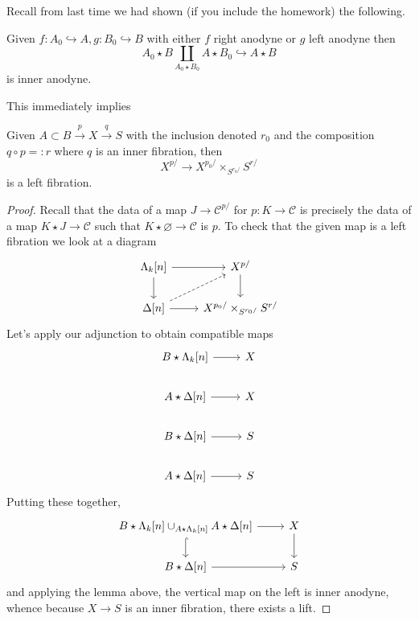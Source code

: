 \documentclass{amsart}
\begin{document}
Recall from last time we had shown (if you include the homework) the following.
\begin{lemma}[HTT 2.1.2.3]
    Given $f:A_0\hookrightarrow A, g:B_0\hookrightarrow B$ with either $f$ right anodyne
    or $g$ left anodyne then
    \begin{equation*}
        A_0\star B\coprod_{A_0\star B_0}A\star B_0 \hookrightarrow A\star B
    \end{equation*}
    is inner anodyne.
\end{lemma}

This immediately implies
\begin{proposition}[HTT 2.1]
    Given $A\subset B\xrightarrow{p} X\xrightarrow{q} S$ with the inclusion denoted $r_0$
    and the composition $q\circ p =: r$ where $q$ is an inner fibration, then 
    \begin{equation*}
        X^{p/} \to X^{p_0/}\times_{S^{r_0/}} S^{r/}
    \end{equation*}
    is a left fibration.
\end{proposition}
\begin{proof}
    Recall that the data of a map $J\to \mathcal{C}^{p/}$ for $p:K\to\mathcal{C}$ is precisely the data of
    a map $K\star J\to \mathcal{C}$ such that $K\star\varnothing\to \mathcal{C}$ is $p$.
    To check that the given map is a left fibration we look at a diagram
    \begin{equation*}
        \begin{tikzcd}
            \Lambda_k[n]\dar \rar & X^{p/}\dar\\
            \Delta[n] \rar\ar[ur,dashed] & X^{p_0/}\times_{S^{r_0/}}S^{r/}
        \end{tikzcd}
    \end{equation*}
    Let's apply our adjunction to obtain compatible maps
    \begin{equation*}
        \begin{tikzcd}
            B\star\Lambda_k[n] \rar & X \\
            A\star \Delta[n] \rar & X \\
            B\star \Delta[n] \rar & S \\
            A\star \Delta[n] \rar & S
        \end{tikzcd}
    \end{equation*}
    Putting these together,
    \begin{equation*}
        \begin{tikzcd}
            B\star \Lambda_k[n] \cup_{A\star \Lambda_k[n]} A\star \Delta[n] \rar\ar[d,hook] & X \dar\\
            B\star \Delta[n] \rar & S
        \end{tikzcd}
    \end{equation*}
    and applying the lemma above, the vertical map on the left is inner anodyne, whence
    because $X\to S$ is an inner fibration, there exists a lift.
\end{proof}
\end{document}
